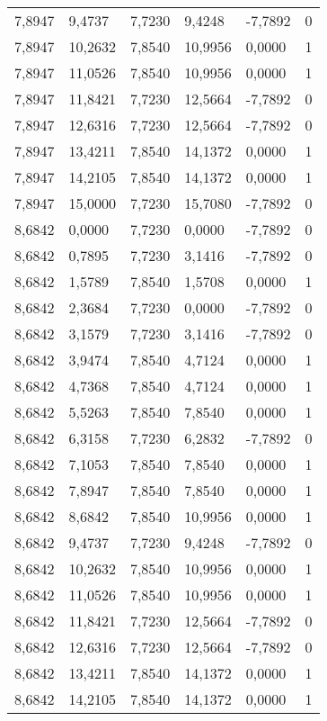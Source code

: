 \begin{longtable}{@{}llllll@{}}
		7,8947  & 9,4737  & 7,7230  & 9,4248  & -7,7892  & 0  \\
		7,8947  & 10,2632 & 7,8540  & 10,9956 & 0,0000   & 1  \\
		7,8947  & 11,0526 & 7,8540  & 10,9956 & 0,0000   & 1  \\
		7,8947  & 11,8421 & 7,7230  & 12,5664 & -7,7892  & 0  \\
		7,8947  & 12,6316 & 7,7230  & 12,5664 & -7,7892  & 0  \\
		7,8947  & 13,4211 & 7,8540  & 14,1372 & 0,0000   & 1  \\
		7,8947  & 14,2105 & 7,8540  & 14,1372 & 0,0000   & 1  \\
		7,8947  & 15,0000 & 7,7230  & 15,7080 & -7,7892  & 0  \\
		8,6842  & 0,0000  & 7,7230  & 0,0000  & -7,7892  & 0  \\
		8,6842  & 0,7895  & 7,7230  & 3,1416  & -7,7892  & 0  \\
		8,6842  & 1,5789  & 7,8540  & 1,5708  & 0,0000   & 1  \\
		8,6842  & 2,3684  & 7,7230  & 0,0000  & -7,7892  & 0  \\
		8,6842  & 3,1579  & 7,7230  & 3,1416  & -7,7892  & 0  \\
		8,6842  & 3,9474  & 7,8540  & 4,7124  & 0,0000   & 1  \\
		8,6842  & 4,7368  & 7,8540  & 4,7124  & 0,0000   & 1  \\
		8,6842  & 5,5263  & 7,8540  & 7,8540  & 0,0000   & 1  \\
		8,6842  & 6,3158  & 7,7230  & 6,2832  & -7,7892  & 0  \\
		8,6842  & 7,1053  & 7,8540  & 7,8540  & 0,0000   & 1  \\
		8,6842  & 7,8947  & 7,8540  & 7,8540  & 0,0000   & 1  \\
		8,6842  & 8,6842  & 7,8540  & 10,9956 & 0,0000   & 1  \\
		8,6842  & 9,4737  & 7,7230  & 9,4248  & -7,7892  & 0  \\
		8,6842  & 10,2632 & 7,8540  & 10,9956 & 0,0000   & 1  \\
		8,6842  & 11,0526 & 7,8540  & 10,9956 & 0,0000   & 1  \\
		8,6842  & 11,8421 & 7,7230  & 12,5664 & -7,7892  & 0  \\
		8,6842  & 12,6316 & 7,7230  & 12,5664 & -7,7892  & 0  \\
		8,6842  & 13,4211 & 7,8540  & 14,1372 & 0,0000   & 1  \\
		8,6842  & 14,2105 & 7,8540  & 14,1372 & 0,0000   & 1  \\

\end{longtable}
